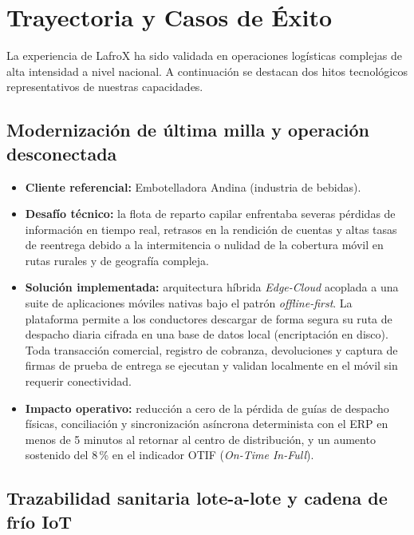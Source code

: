 \section{Trayectoria y Casos de Éxito}

La experiencia de LafroX ha sido validada en operaciones logísticas complejas de alta
intensidad a nivel nacional. A continuación se destacan dos hitos tecnológicos
representativos de nuestras capacidades.

\subsection{Modernización de última milla y operación desconectada}

\begin{itemize}
  \item \textbf{Cliente referencial:} Embotelladora Andina (industria de bebidas).
  \item \textbf{Desafío técnico:} la flota de reparto capilar enfrentaba severas pérdidas
        de información en tiempo real, retrasos en la rendición de cuentas y altas tasas
        de reentrega debido a la intermitencia o nulidad de la cobertura móvil en rutas
        rurales y de geografía compleja.
  \item \textbf{Solución implementada:} arquitectura híbrida \emph{Edge-Cloud} acoplada a
        una suite de aplicaciones móviles nativas bajo el patrón \emph{offline-first}.
        La plataforma permite a los conductores descargar de forma segura su ruta de
        despacho diaria cifrada en una base de datos local (encriptación en disco). Toda
        transacción comercial, registro de cobranza, devoluciones y captura de firmas de
        prueba de entrega se ejecutan y validan localmente en el móvil sin requerir
        conectividad.
  \item \textbf{Impacto operativo:} reducción a cero de la pérdida de guías de despacho
        físicas, conciliación y sincronización asíncrona determinista con el ERP en menos
        de 5 minutos al retornar al centro de distribución, y un aumento sostenido del
        8\,\% en el indicador OTIF (\emph{On-Time In-Full}).
\end{itemize}

\subsection{Trazabilidad sanitaria lote-a-lote y cadena de frío IoT}

